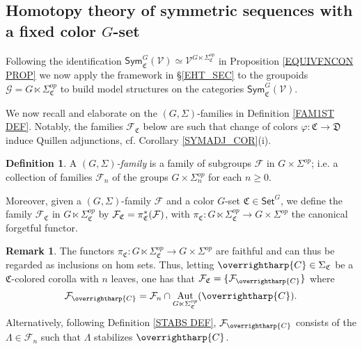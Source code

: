 \documentclass[a4paper,10pt
,draft
]{article}%
\numberwithin{equation}{section}
\numberwithin{figure}{section}
\theoremstyle{definition} %
\newtheorem{definition}[equation]{Definition}%
\newtheorem{remark}[equation]{Remark}%
\newcommand{\vect}[1]{\text{\overrightharp{\ensuremath{#1}}}}
\DeclareMathOperator{\Aut}{Aut}%
\newcommand{\F}{\ensuremath{\mathcal F}}
\newcommand{\V}{\ensuremath{\mathcal V}}
\newcommand{\G}{\ensuremath{\mathcal G}}
\newcommand{\1}{\ensuremath{\mathbbm 1}}%
\begin{document}
\subsection{Homotopy theory of symmetric sequences with a fixed color $G$-set}
\label{SYMC_MS_SEC}


Following the identification 
$\mathsf{Sym}^G_{\mathfrak{C}}(\V)
\simeq \V^{G \ltimes \Sigma^{op}_{\mathfrak{C}}}$
in Proposition \ref{EQUIVFNCON PROP}
we now apply the framework in \S \ref{EHT_SEC}  
to the groupoids
$\G = G \ltimes \Sigma_{\mathfrak C}^{op}$
to build model structures on the categories 
$\mathsf{Sym}^G_{\mathfrak{C}}(\V)$.
%

We now recall and elaborate on the $(G,\Sigma)$-families in Definition \ref{FAM1ST DEF}.
Notably, the families $\mathcal{F}_{\mathfrak{C}}$ below 
are such that 
change of colors $\varphi \colon \mathfrak{C} \to \mathfrak{D}$ 
induce Quillen adjunctions, cf. Corollary \ref{SYMADJ_COR}(i).




\begin{definition}\label{GSFAM_DEF}
A \emph{$(G,\Sigma)$-family} is a family of subgroups $\mathcal{F}$ in $G \times \Sigma^{op}$;
i.e.
a collection of families $\F_n$ of the groups $G\times \Sigma_n^{op}$ for each $n \geq 0$.
      
Moreover, given a $(G,\Sigma)$-family $\F$ and a color $G$-set $\mathfrak C \in \mathsf{Set}^G$,
we define the family
$\mathcal{F}_{\mathfrak{C}}$ in
$G \ltimes \Sigma^{op}_{\mathfrak{C}}$
by $\mathcal{F}_{\mathfrak{C}} = \pi^{\**}_{\mathfrak{C}}(\mathcal{F})$,
with $\pi_{\mathfrak{C}} \colon G \ltimes \Sigma_{\mathfrak{C}}^{op} \to G \times \Sigma^{op}$
the canonical forgetful functor.
\end{definition}






\begin{remark}\label{FAMC_DEF_REM}
The functors
$\pi_{\mathfrak{C}} \colon
G \ltimes \Sigma_{\mathfrak{C}}^{op} \to
G \times \Sigma^{op}$
are faithful and can thus be regarded as inclusions on hom sets.
Thus, letting $\vect{C} \in \Sigma_{\mathfrak{C}}$ be a
$\mathfrak{C}$-colored corolla with $n$ leaves,
one has that
$\F_{\mathfrak{C}} = \{\F_{\vect{C}}\}$ where
\begin{equation}\label{FAMC_DEF_EQ}
	\F_{\vect{C}} = \F_n \cap \Aut_{G \ltimes \Sigma_{\mathfrak C}^{op}}(\vect C).
\end{equation}
Alternatively, following
Definition \ref{STABS DEF},
$\F_{\vect{C}}$ consists of the $\Lambda \in \F_n$
such that $\Lambda$ stabilizes $\vect{C}$.
\end{remark}
\end{document}
